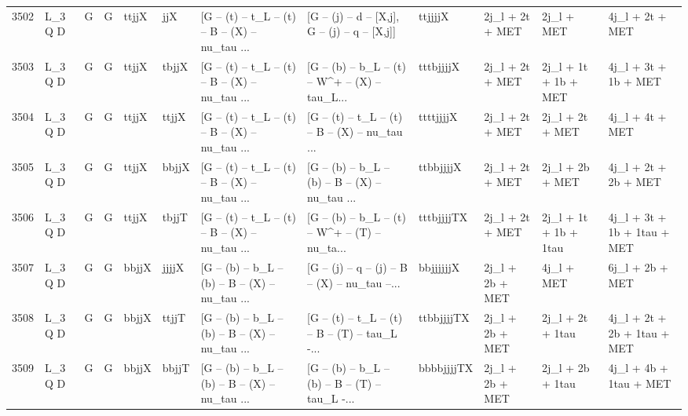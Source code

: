 \begin{tabular}{llllllllllll}
3502 &      L\_3 Q D &     G &     G &       ttjjX &         jjX &  [G -- (t) -- t\_L -- (t) -- B -- (X) -- nu\_tau ... &   [G -- (j) -- d -- [X,j], G -- (j) -- q -- [X,j]] &     ttjjjjX &          2j\_l + 2t + MET &               2j\_l + MET &                    4j\_l + 2t + MET \\
3503 &      L\_3 Q D &     G &     G &       ttjjX &       tbjjX &  [G -- (t) -- t\_L -- (t) -- B -- (X) -- nu\_tau ... &  [G -- (b) -- b\_L -- (t) -- W\textasciicircum + -- (X) -- tau\_L... &   tttbjjjjX &          2j\_l + 2t + MET &     2j\_l + 1t + 1b + MET &               4j\_l + 3t + 1b + MET \\
3504 &      L\_3 Q D &     G &     G &       ttjjX &       ttjjX &  [G -- (t) -- t\_L -- (t) -- B -- (X) -- nu\_tau ... &  [G -- (t) -- t\_L -- (t) -- B -- (X) -- nu\_tau ... &   ttttjjjjX &          2j\_l + 2t + MET &          2j\_l + 2t + MET &                    4j\_l + 4t + MET \\
3505 &      L\_3 Q D &     G &     G &       ttjjX &       bbjjX &  [G -- (t) -- t\_L -- (t) -- B -- (X) -- nu\_tau ... &  [G -- (b) -- b\_L -- (b) -- B -- (X) -- nu\_tau ... &   ttbbjjjjX &          2j\_l + 2t + MET &          2j\_l + 2b + MET &               4j\_l + 2t + 2b + MET \\
3506 &      L\_3 Q D &     G &     G &       ttjjX &       tbjjT &  [G -- (t) -- t\_L -- (t) -- B -- (X) -- nu\_tau ... &  [G -- (b) -- b\_L -- (t) -- W\textasciicircum + -- (T) -- nu\_ta... &  tttbjjjjTX &          2j\_l + 2t + MET &    2j\_l + 1t + 1b + 1tau &        4j\_l + 3t + 1b + 1tau + MET \\
3507 &      L\_3 Q D &     G &     G &       bbjjX &       jjjjX &  [G -- (b) -- b\_L -- (b) -- B -- (X) -- nu\_tau ... &  [G -- (j) -- q -- (j) -- B -- (X) -- nu\_tau --... &   bbjjjjjjX &          2j\_l + 2b + MET &               4j\_l + MET &                    6j\_l + 2b + MET \\
3508 &      L\_3 Q D &     G &     G &       bbjjX &       ttjjT &  [G -- (b) -- b\_L -- (b) -- B -- (X) -- nu\_tau ... &  [G -- (t) -- t\_L -- (t) -- B -- (T) -- tau\_L -... &  ttbbjjjjTX &          2j\_l + 2b + MET &         2j\_l + 2t + 1tau &        4j\_l + 2t + 2b + 1tau + MET \\
3509 &      L\_3 Q D &     G &     G &       bbjjX &       bbjjT &  [G -- (b) -- b\_L -- (b) -- B -- (X) -- nu\_tau ... &  [G -- (b) -- b\_L -- (b) -- B -- (T) -- tau\_L -... &  bbbbjjjjTX &          2j\_l + 2b + MET &         2j\_l + 2b + 1tau &             4j\_l + 4b + 1tau + MET \\

\end{tabular}
